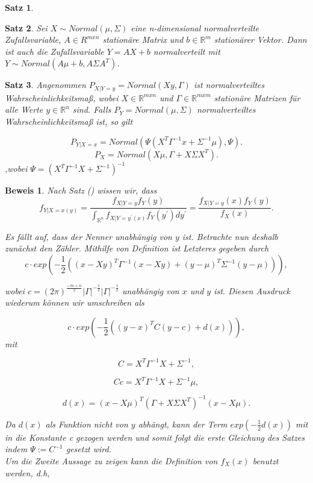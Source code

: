 \documentclass[12pt,a4paper]{scrartcl}
\newtheorem{Satz}{Satz}[section]
\newtheorem{Beweis}{Beweis}
\numberwithin{equation}{section}
\newcommand{\R}{\mathbb{R}} %
\begin{document}
{\begin{Satz}
\end{Satz}

\begin{Satz}
 Sei $X \sim Normal(\mu,\varSigma)$ eine n-dimensional normalverteilte Zufallsvariable,
 $A \in R^{mxn}$ stationäre Matrix und $b \in \R^m$ stationärer Vektor. Dann ist auch die Zufallsvariable 
 $Y = AX + b$ normalverteilt mit $Y \sim Normal(A\mu + b, A\varSigma A^{T})$.
\end{Satz}

\begin{Satz}
 Angenommen $P_{X|Y=y}=Normal(Xy,\Gamma)$ ist normalverteiltes Wahrscheinlichkeitsmaß, wobei 
 $X \in \R^{mxn}$ und $\Gamma \in \R^{mxm}$ stationäre Matrizen für alle Werte $y \in \R^{n}$ sind. Falls
 $P_{Y} = Normal(\mu,\varSigma)$ normalverteiltes Wahrscheinlichkeitsmaß ist, so gilt
 
 \begin{equation}
 P_{Y|X=x} = Normal(\Psi(X^{T}\Gamma^{-1}x+\varSigma^{-1}\mu),\Psi).
 \end{equation}
 \begin{equation}
  P_{X} = Normal(X\mu,\Gamma+X\varSigma X^{T}).
 \end{equation}
 ,wobei $\Psi = (X^{T}\Gamma^{-1}X+\varSigma^{-1})^{-1}$
\end{Satz}

\begin{Beweis}
 Nach Satz () wissen wir, dass 
$$
  f_{Y|X=x(y)} = \frac{f_{X|Y=y}f_{Y}(y)}{\int_{\R^n}f_{X|Y=y^{'}(x)}f_{Y}(y^{'})dy^{'}} 
 = \frac{f_{X|Y=y}(x)f_{Y}(y)}{f_{X}(x)}.
$$

 Es fällt auf, dass der Nenner unabhängig von $y$ ist. Betrachte nun deshalb zunächst den Zähler.
 Mithilfe von Definition ist Letzteres gegeben durch 
 $$ 
 c\cdot exp(-\frac{1}{2}((x-Xy)^{T}\Gamma^{-1}(x-Xy)+(y-\mu)^{T}\varSigma^{-1}(y-\mu))),
 $$

 
 wobei $c = (2\pi)^{\frac{-m+n}{2}}|\Gamma|^{-\frac{1}{2}}|\Gamma|^{-\frac{1}{2}}$ unabhängig von 
 $x$ und $y$ ist.
 Diesen Ausdruck wiederum können wir umschreiben als 
 
 $$
 c \cdot exp(-\frac{1}{2}((y-x)^{T}C(y-c)+d(x))), 
 $$
 mit 
 
 $$
 C = X^{T}\Gamma^{-1}X+\varSigma^{-1},
 $$
 
 $$
 Cc = X^{T}\Gamma^{-1}X+\varSigma^{-1}\mu,
 $$
 
 $$
 d(x) = (x-X\mu)^{T}(\Gamma+X\varSigma X^{T})^{-1}(x-X\mu).
 $$
 
 Da $d(x)$ als Funktion nicht von $y$ abhängt, kann der Term $exp(-\frac{1}{2}d(x))$ mit in die
 Konstante c gezogen werden und somit folgt die erste Gleichung des Satzes indem $\Psi:=C^{-1}$
 gesetzt wird.\\
 Um die Zweite Aussage zu zeigen kann die Definition von $f_{X}(x)$ benutzt werden, d.h,
 

\end{Beweis}}
\end{document}
